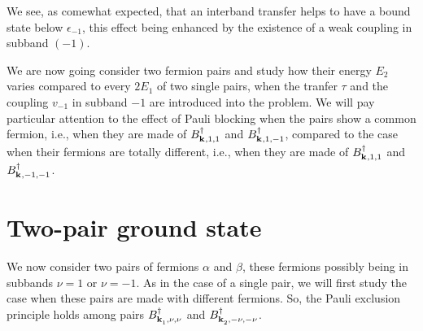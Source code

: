 \documentclass[11pt]{article} %
\begin{document}
We see, as comewhat expected, that an interband transfer helps to have a bound state below $\epsilon_{-1}$, this effect being enhanced by the existence of a weak coupling in subband $(-1)$.  

We are now going consider two fermion pairs and study how their energy $E_2$ varies compared to every $2E_1$ of two single pairs, when the tranfer $\tau$ and the coupling $v_{-1}$ in subband $-1$ are introduced into the problem.  We will 
pay particular attention to the effect of Pauli blocking when the pairs show a common fermion, i.e., when they are made of $B^{\dagger}_{\mathbf{k}^{ },1,1}$ and $B^{\dagger}_{\mathbf{k}^{ },1,-1}$, compared to the case when their fermions are totally different, i.e., when they are made of $B^{\dagger}_{\mathbf{k}^{ },1,1}$ and $B^{\dagger}_{\mathbf{k}^{ },-1,-1}$.

\section{Two-pair ground state}
We now consider two pairs of fermions $\alpha$ and $\beta$, these fermions possibly being in subbands $\nu=1$ or $\nu=-1$.  As in the case of a single pair, we will first study the case when these pairs are made with different fermions.  So, the Pauli exclusion principle holds among pairs $B^{\dagger}_{\mathbf{k}_1^{ },\nu,\nu}$ and $B^{\dagger}_{\mathbf{k}_2^{ },-\nu,-\nu}$.
\end{document}
